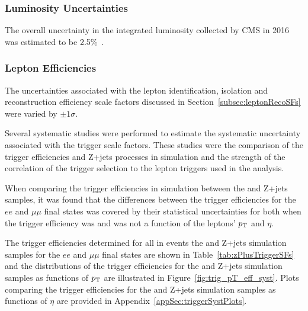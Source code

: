 \subsubsection*{Luminosity Uncertainties}
The overall uncertainty in the integrated luminosity collected by CMS in 2016 was estimated to be 2.5\%~\cite{CMS:2017_lumi}.

\subsubsection*{Lepton Efficiencies}
The uncertainties associated with the lepton identification, isolation and reconstruction efficiency scale factors discussed in Section~\ref{subsec:leptonRecoSFs} were varied by $\pm 1 \sigma$.

Several systematic studies were performed to estimate the systematic uncertainty associated with the trigger scale factors.
These studies were the comparison of the trigger efficiencies \ttbar and Z+jets processes in simulation and the strength of the correlation of the \MET trigger selection to the lepton triggers used in the analysis.


When comparing the trigger efficiencies in simulation between the \ttbar and Z+jets samples, it was found that the differences between the trigger efficiencies for the $ee$ and $\mu\mu$ final states was covered by their statistical uncertainties for both when the trigger efficiency was and was not a function of the leptons' $p_{\mathrm{T}}$ and $\eta$.

The trigger efficiencies determined for all in events the \ttbar and Z+jets simulation samples for the $ee$ and $\mu\mu$ final states are shown in Table~\ref{tab:zPlusTriggerSFs} and the distributions of the trigger efficiencies for the \ttbar and Z+jets simulation samples as functions of $p_{\mathrm{T}}$ are illustrated in Figure~\ref{fig:trig_pT_eff_syst}.
Plots comparing the trigger efficiencies for the \ttbar and Z+jets simulation samples as functions of $\eta$ are provided in Appendix~\ref{appSec:triggerSystPlots}.

